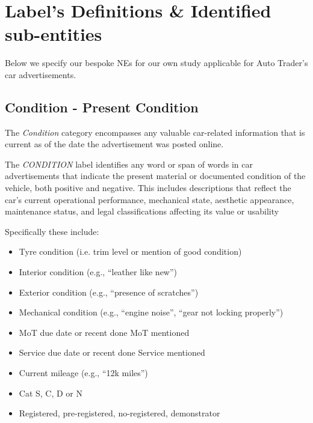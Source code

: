 \documentclass[11pt]{article}
\begin{document}


% 

\appendix

\section{Label's Definitions \& Identified sub-entities}
\label{sec:appendix:labels}

Below we specify our bespoke NEs for our own study applicable for Auto Trader's car advertisements.

\subsection*{Condition - Present Condition}
The \textit{Condition} category encompasses any valuable car-related information that is current as of the date the advertisement was posted online.
\begin{tcolorbox}[colback=gray!5!white, colframe=gray!75!black, title=Definition]
The \textit{CONDITION} label identifies any word or span of words in car advertisements that indicate the present material or documented condition of the vehicle, both positive and negative. This includes descriptions that reflect the car's current operational performance, mechanical state, aesthetic appearance, maintenance status, and legal classifications affecting its value or usability
\end{tcolorbox}
Specifically these include:
\begin{itemize}
    \item Tyre condition (i.e. trim level or mention of good condition)
    \item Interior condition (e.g., ``leather like new'')
    \item Exterior condition (e.g., ``presence of scratches'')
    \item Mechanical condition (e.g., ``engine noise'', ``gear not locking properly'')
    \item MoT due date or recent done MoT mentioned
    \item Service due date or recent done Service mentioned
    \item Current mileage (e.g., ``12k miles'')
    \item Cat S, C, D or N
    \item Registered, pre-registered, no-registered, demonstrator
\end{itemize}
\end{document}
